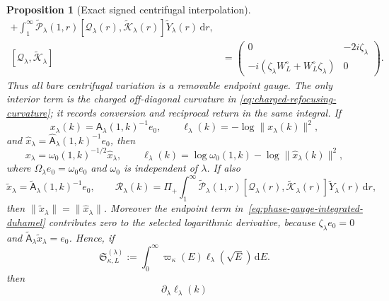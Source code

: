\documentclass[11pt]{article}
\newcommand{\dd}{\,\mathrm d}
\newtheorem{proposition}[theorem]{Proposition}
\theoremstyle{definition}
\theoremstyle{remark}
\begin{document}
\begin{proposition}[Exact signed centrifugal interpolation]
\begin{align}
   +\int_1^\infty
    \widetilde{\mathcal P}_\lambda(1,r)
    [\mathcal Q_\lambda(r),\widetilde{\mathcal K}_\lambda(r)]
    \widetilde Y_\lambda(r)\dd r,
 \label{eq:phase-gauge-integrated-duhamel}\\
 [\mathcal Q_\lambda,\widetilde{\mathcal K}_\lambda]
 &=\begin{pmatrix}
    0&-2i\zeta_\lambda\\
    -i(\zeta_\lambda W_L^\circ+W_L^\circ\zeta_\lambda)&0
   \end{pmatrix}.
 \label{eq:charged-refocusing-curvature}
\end{align}
Thus all bare centrifugal variation is a removable endpoint gauge.  The only
interior term is the charged off-diagonal curvature in
\eqref{eq:charged-refocusing-curvature}; it records conversion and reciprocal
return in the same integral.
If
\begin{equation}
 x_\lambda(k)=\mathsf A_\lambda(1,k)^{-1}e_0,
 \qquad
 \ell_\lambda(k)=-\log\|x_\lambda(k)\|^2,
 \label{eq:centrifugal-selected-loss}
\end{equation}
and $\widehat x_\lambda
=\widehat{\mathsf A}_\lambda(1,k)^{-1}e_0$, then
\begin{equation}
 x_\lambda=\omega_0(1,k)^{-1/2}\widehat x_\lambda,
 \qquad
 \ell_\lambda(k)=\log\omega_0(1,k)
 -\log\|\widehat x_\lambda(k)\|^2,
 \label{eq:selected-loss-balanced-equivalence}
\end{equation}
where $\Omega_\lambda e_0=\omega_0e_0$ and $\omega_0$ is independent of
$\lambda$.
If also
\begin{equation}
 \widetilde x_\lambda
 =\widetilde{\mathsf A}_\lambda(1,k)^{-1}e_0,
 \qquad
 \mathcal R_\lambda(k)
 =\Pi_+\int_1^\infty
    \widetilde{\mathcal P}_\lambda(1,r)
    [\mathcal Q_\lambda(r),\widetilde{\mathcal K}_\lambda(r)]
    \widetilde Y_\lambda(r)\dd r,
 \label{eq:charged-refocusing-remainder}
\end{equation}
then $\|\widetilde x_\lambda\|=\|\widehat x_\lambda\|$.  Moreover the
endpoint term in~\eqref{eq:phase-gauge-integrated-duhamel} contributes zero to
the selected logarithmic derivative, because
$\zeta_\lambda e_0=0$ and
$\widetilde{\mathsf A}_\lambda\widetilde x_\lambda=e_0$.  Hence, if
\begin{equation}
 \mathfrak S_{\kappa,L}^{(\lambda)}
 :=\int_0^\infty\varpi_\kappa(E)
       \ell_\lambda(\sqrt E)\dd E.
 \label{eq:lambda-signed-radiation-functional}
\end{equation}
then
\begin{equation}
 \partial_\lambda\ell_\lambda(k)

\end{equation}
\end{proposition}
\end{document}

